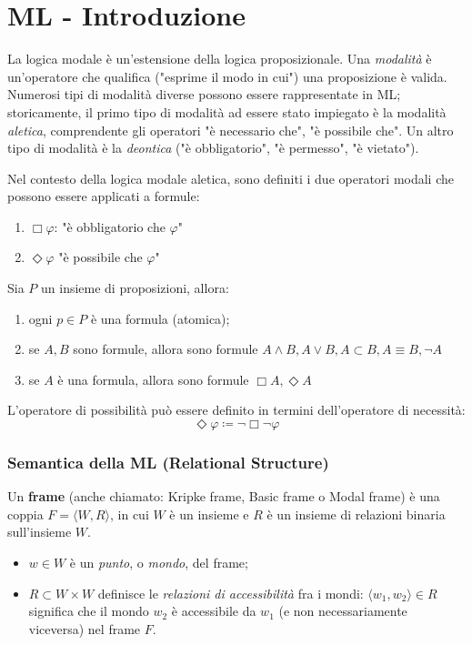 \chapter{ML - Introduzione}

	La logica modale è un'estensione della logica proposizionale. Una \textit{modalità} è un'operatore che qualifica ("esprime il modo in cui") una proposizione è valida.
	Numerosi tipi di modalità diverse possono essere rappresentate in ML; storicamente, il primo tipo di modalità ad essere stato impiegato è la modalità \textit{aletica}, comprendente gli operatori "è necessario che", "è possibile che". Un altro tipo di modalità è la \textit{deontica} ("è obbligatorio", "è permesso", "è vietato").
	
\begin{fdefinition}
Nel contesto della logica modale aletica, sono definiti i due operatori modali che possono essere applicati a formule:
\begin{enumerate}
\item $\Box \varphi$: "è obbligatorio che $\varphi$"
\item $\Diamond \varphi$ "è possibile che $\varphi$"
\end{enumerate}
Sia $P$ un insieme di proposizioni, allora:
\begin{enumerate}
\item ogni $p \in P$ è una formula (atomica);
\item se $A, B$ sono formule, allora sono formule $A \land B, A \lor B, A \subset B, A \equiv B, \lnot A$
\item se $A$ è una formula, allora sono formule $\Box A, \Diamond A$
\end{enumerate}

L'operatore di possibilità può essere definito in termini dell'operatore di necessità:
$$\Diamond \varphi \coloneqq \lnot \Box \lnot \varphi$$
\end{fdefinition}

\subsection{Semantica della ML (Relational Structure)}
Un \textbf{frame} (anche chiamato: Kripke frame, Basic frame o Modal frame) è una coppia $F = \langle W, R\rangle$, in cui $W$ è un insieme e $R$ è un insieme di relazioni binaria sull'insieme $W$.
\begin{itemize}
\item $w \in W$ è un \textit{punto}, o \textit{mondo}, del frame;
\item $R \subset W \times W$ definisce le \textit{relazioni di accessibilità} fra i mondi: $\langle w_1, w_2 \rangle \in R$ significa che il mondo $w_2$ è accessibile da $w_1$ (e non necessariamente viceversa) nel frame $F$.
\end{itemize}

